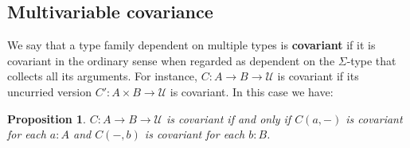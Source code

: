 \documentclass[12pt]{amsart}
\theoremstyle{plain}
\newtheorem{prop}[thm]{Proposition}
\theoremstyle{definition}
\theoremstyle{remark}
\numberwithin{equation}{section}
\newcommand{\univtype}{\mathcal{U}}
\begin{document}
\subsection{Multivariable covariance}
\label{sec:mult-covar}

We say that a type family dependent on multiple types is \textbf{covariant} if it is covariant in the ordinary sense when regarded as dependent on the $\Sigma$-type that collects all its arguments.
For instance, $C:A\to B\to \univtype$ is covariant if its uncurried version $C' : A\times B \to \univtype$ is covariant.
In this case we have:

\begin{prop}\label{thm:multivar-covar}
  $C:A\to B\to \univtype$ is covariant if and only if $C(a,-)$ is covariant for each $a:A$ and $C(-,b)$ is covariant for each $b:B$.
\end{prop}
\end{document}
